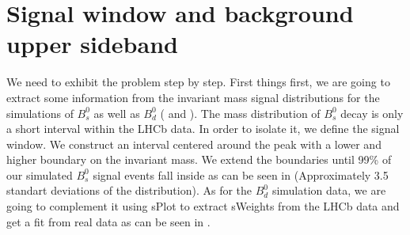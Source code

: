 
\section{Signal window and background upper sideband}

\begin{figure}[H]
    \centering
    \hfill %
    \hfill
    \caption{}
\end{figure}

We need to exhibit the problem step by step. First things first, we are going to extract some information from the invariant mass signal distributions for the simulations of $B_s^0$ as well as $B_d^0$ ( and ). The mass distribution of $B_s^0$ decay is only a short interval within the LHCb data. In order to isolate it, we define the signal window. We construct an interval centered around the peak with a lower and higher boundary on the invariant mass. We extend the boundaries until 99\% of our simulated $B_s^0$ signal events fall inside as can be seen in  (Approximately 3.5 standart deviations of the distribution). As for the $B_d^0$ simulation data, we are going to complement it using sPlot to extract sWeights from the LHCb data and get a fit from real data as can be seen in .\newline

